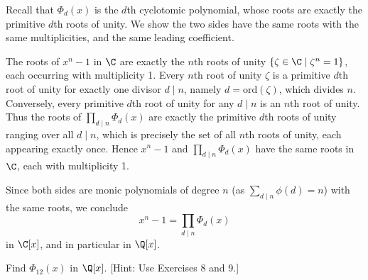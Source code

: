 \begin{solution}
  Recall that $\Phi_d(x)$ is the $d$th cyclotomic polynomial, whose roots are exactly the primitive $d$th roots of unity. We show the two sides have the same roots with the same multiplicities, and the same leading coefficient.

  The roots of $x^n - 1$ in $\C$ are exactly the $n$th roots of unity $\{\zeta \in \C \mid \zeta^n = 1\}$, each occurring with multiplicity 1. Every $n$th root of unity $\zeta$ is a primitive $d$th root of unity for exactly one divisor $d \mid n$, namely $d = \text{ord}(\zeta)$, which divides $n$. Conversely, every primitive $d$th root of unity for any $d \mid n$ is an $n$th root of unity. Thus the roots of $\prod_{d \mid n} \Phi_d(x)$ are exactly the primitive $d$th roots of unity ranging over all $d \mid n$, which is precisely the set of all $n$th roots of unity, each appearing exactly once. Hence $x^n - 1$ and $\prod_{d \mid n} \Phi_d(x)$ have the same roots in $\C$, each with multiplicity 1.

  Since both sides are monic polynomials of degree $n$ (as $\sum_{d \mid n} \phi(d) = n$) with the same roots, we conclude
  \[%
    x^n - 1 = \prod_{d \mid n} \Phi_d(x)
  \]%
  in $\C[x]$, and in particular in $\Q[x]$.
\end{solution}

\begin{problem}[48.10]
  Find $\Phi_{12}(x)$ in $\Q[x]$. [Hint: Use Exercises 8 and 9.]
\end{problem}

